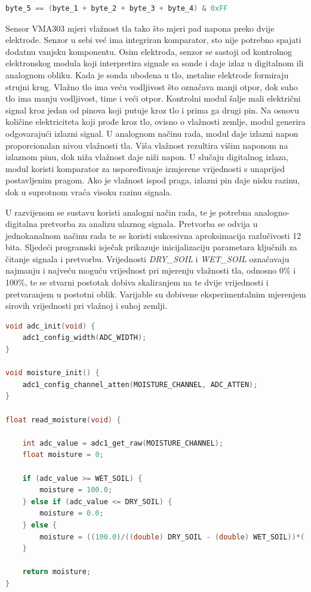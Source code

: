 \begin{lstlisting}[caption={Kontrolni zbroj poslanih bajtova s DHT11}, language=c]
	byte_5 == (byte_1 + byte_2 + byte_3 + byte_4) & 0xFF
\end{lstlisting}

Sensor VMA303 mjeri vlažnost tla tako što mjeri pad napona preko dvije elektrode. Senzor u sebi već ima integriran komparator, sto nije potrebno spajati dodatnu vanjsku komponentu. Osim elektroda, senzor se sastoji od kontrolnog elektronskog modula koji interpretira signale sa sonde i daje izlaz u digitalnom ili analognom obliku. Kada je sonda ubodena u tlo, metalne elektrode formiraju strujni krug. Vlažno tlo ima veću vodljivost što označava manji otpor, dok suho tlo ima manju vodljivost, time i veći otpor. Kontrolni modul šalje mali električni signal kroz jedan od pinova koji putuje kroz tlo i prima ga drugi pin. Na osnovu količine elektriciteta koji prođe kroz tlo, ovisno o vlažnosti zemlje, modul generira odgovarajući izlazni signal. U analognom načinu rada, modul daje izlazni napon proporcionalan nivou vlažnosti tla. Viša vlažnost rezultira višim naponom na izlaznom pinu, dok niža vlažnost daje niži napon. U slučaju digitalnog izlaza, modul koristi komparator za uspoređivanje izmjerene vrijednosti s unaprijed postavljenim pragom. Ako je vlažnost ispod praga, izlazni pin daje nisku razinu, dok u suprotnom vraća visoku razinu signala.

U razvijenom se sustavu koristi analogni način rada, te je potrebna analogno-digitalna pretvorba za analizu ulaznog signala. Pretvorba se odvija u jednokanalnom načinu rada te se koristi sukcesivna aproksimacija razlučivosti 12 bita. Sljedeći programski isječak prikazuje inicijalizaciju parametara ključnih za čitanje signala i pretvorbu. Vrijednosti \textit{DRY\_SOIL} i \textit{WET\_SOIL} označavaju najmanju i najveću moguću vrijednost pri mjerenju vlažnosti tla, odnosno 0\% i 100\%, te se stvarni postotak dobiva skaliranjem na te dvije vrijednosti i pretvaranjem u postotni oblik. Varijable su dobivene eksperimentalnim mjerenjem sirovih vrijednosti pri vlažnoj i suhoj zemlji. 

\begin{lstlisting}[caption={}, language=c]
void adc_init(void) {
	adc1_config_width(ADC_WIDTH);
}

void moisture_init() {
	adc1_config_channel_atten(MOISTURE_CHANNEL, ADC_ATTEN);
}

float read_moisture(void) {
	
	int adc_value = adc1_get_raw(MOISTURE_CHANNEL);
	float moisture = 0;
	
	if (adc_value >= WET_SOIL) {
		moisture = 100.0;
	} else if (adc_value <= DRY_SOIL) {
		moisture = 0.0;
	} else {
		moisture = ((100.0)/((double) DRY_SOIL - (double) WET_SOIL))*((double) (adc_value) - (double) WET_SOIL);
	}
	
	return moisture;
}
\end{lstlisting}

